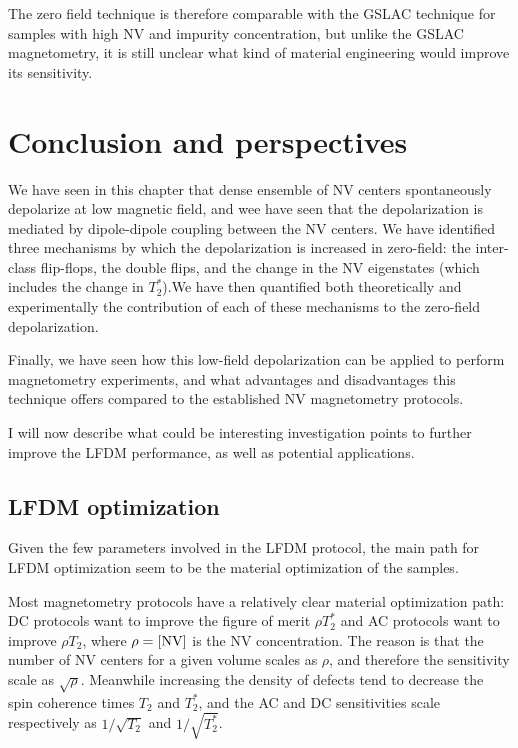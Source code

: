 \documentclass[a4paper,11pt]{report}
\begin{document}
\begin{refsection}
The zero field technique is therefore comparable with the GSLAC technique for samples with high NV and impurity concentration, but unlike the GSLAC magnetometry, it is still unclear what kind of material engineering would improve its sensitivity.

\section{Conclusion and perspectives}
We have seen in this chapter that dense ensemble of NV centers spontaneously depolarize at low magnetic field, and wee have seen that the depolarization is mediated by dipole-dipole coupling between the NV centers. We have identified three mechanisms by which the depolarization is increased in zero-field: the inter-class flip-flops, the double flips, and the change in the NV eigenstates (which includes the change in $T_2^*$).We have then quantified both theoretically and experimentally the contribution of each of these mechanisms to the zero-field depolarization.

Finally, we have seen how this low-field depolarization can be applied to perform magnetometry experiments, and what advantages and disadvantages this technique offers compared to the established NV magnetometry protocols.

I will now describe what could be interesting investigation points to further improve the LFDM performance, as well as potential applications.

\subsection{LFDM optimization}

Given the few parameters involved in the LFDM protocol, the main path for LFDM optimization seem to be the material optimization of the samples.

Most magnetometry protocols have a relatively clear material optimization path: DC protocols want to improve the figure of merit $\rho T_2^*$ and AC protocols want to improve $\rho T_2$, where $\rho=[\rm NV]$ is the NV concentration. The reason is that the number of NV centers for a given volume scales as $\rho$, and therefore the sensitivity scale as $\sqrt{\rho}$. Meanwhile increasing the density of defects tend to decrease the spin coherence times $T_2$ and $T_2^*$, and the AC and DC sensitivities scale respectively as $1/\sqrt{T_2}$ and $1/\sqrt{T_2^*}$.


\end{refsection}
\end{document}
